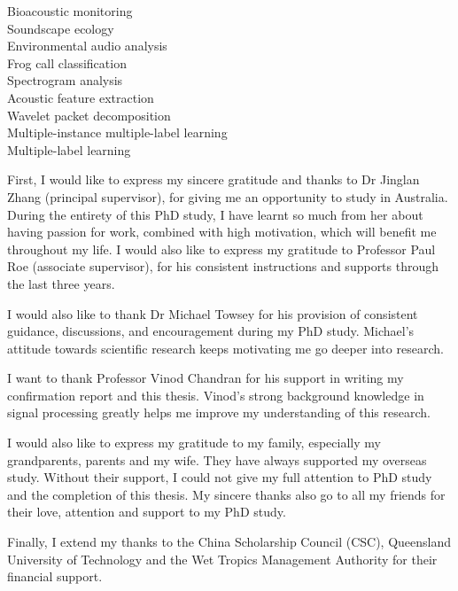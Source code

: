 \begin{keywords}
Bioacoustic monitoring \\
Soundscape ecology\\
Environmental audio analysis \\
Frog call classification \\
Spectrogram analysis \\
Acoustic feature extraction \\
Wavelet packet decomposition \\
Multiple-instance multiple-label learning \\
Multiple-label learning \\
 
\end{keywords}






\begin{ack}
First, I would like to express my sincere gratitude and thanks to Dr Jinglan Zhang (principal supervisor), for giving me an opportunity to study in Australia. During the entirety of this PhD study, I have learnt so much from her about having passion for work, combined with high motivation, which will benefit me throughout my life. 
I would also like to express my gratitude to Professor Paul Roe (associate supervisor), for his consistent instructions and supports through the last three years.  

I would also like to thank Dr Michael Towsey for his provision of consistent guidance, discussions, and encouragement during my PhD study. Michael's attitude towards scientific research keeps motivating me go deeper into research.  


I want to thank Professor Vinod Chandran for his support in writing my confirmation report and this thesis. Vinod's strong background knowledge in signal processing greatly helps me improve my understanding of this research.

I would also like to express my gratitude to my family, especially my grandparents, parents and my wife. They have always supported my overseas study. Without their support, I could not give my full attention to PhD study and  the completion of this thesis. 
My sincere thanks also go to all my friends for their love, attention and support to my PhD study. 

Finally, I extend my thanks to the China Scholarship Council (CSC), Queensland University of Technology and the Wet Tropics Management Authority for their financial support. 

\end{ack}





\afterpreface
